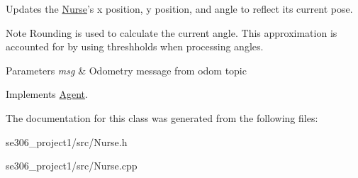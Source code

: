 Updates the \hyperlink{classNurse}{Nurse}'s x position, y position, and angle to reflect its current pose. 

\begin{DoxyNote}{Note}
Rounding is used to calculate the current angle. This approximation is accounted for by using threshholds when processing angles. 
\end{DoxyNote}

\begin{DoxyParams}{Parameters}
{\em msg} & Odometry message from odom topic \\
\hline
\end{DoxyParams}


Implements \hyperlink{classAgent}{Agent}.



The documentation for this class was generated from the following files\-:\begin{DoxyCompactItemize}
\item 
se306\-\_\-project1/src/Nurse.\-h\item 
se306\-\_\-project1/src/Nurse.\-cpp\end{DoxyCompactItemize}
